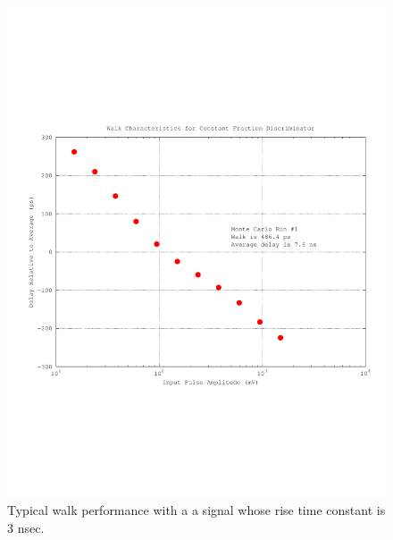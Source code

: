 \documentclass[12pt,oneside,final]{siuethesis}
\theoremstyle{definition}
\begin{document}
\begin{figure}[htbp!]
	\centering
 	\includegraphics[scale=0.8,keepaspectratio=true]{../Design_Reports/CFD_circuit_report/images/typical_walk.pdf} 	
 	\caption{Typical walk performance with a a signal whose rise time constant is 3 nsec.}
 	\label{FIG:TYPICAL_WALK}
\end{figure}
\end{document}
